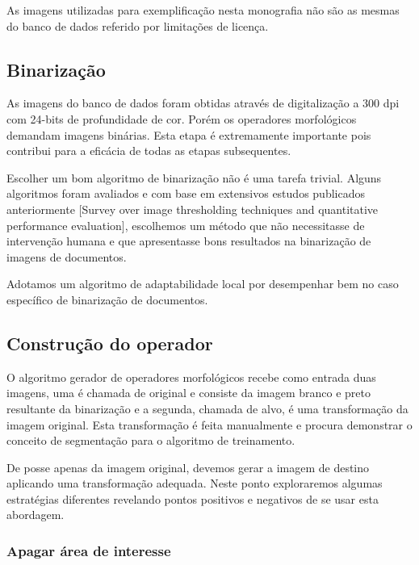 \documentclass[a4paper,11pt]{article}
\begin{document}
      As imagens utilizadas para exemplificação nesta monografia não são as mesmas do banco de dados referido por limitações de licença.

    \subsection{Binarização}

      As imagens do banco de dados foram obtidas através de digitalização a 300 dpi com 24-bits de profundidade de cor. Porém os operadores morfológicos demandam imagens binárias. Esta etapa é extremamente importante pois contribui para a eficácia de todas as etapas subsequentes.

      Escolher um bom algoritmo de binarização não é uma tarefa trivial. Alguns algoritmos foram avaliados e com base em extensivos estudos publicados anteriormente [Survey over image thresholding techniques and quantitative performance evaluation], escolhemos um método que não necessitasse de intervenção humana e que apresentasse bons resultados na binarização de imagens de documentos.

      Adotamos um algoritmo de adaptabilidade local por desempenhar bem no caso específico de binarização de documentos.

    \subsection{Construção do operador}

      O algoritmo gerador de operadores morfológicos recebe como entrada duas imagens, uma é chamada de original e consiste da imagem branco e preto resultante da binarização e a segunda, chamada de alvo, é uma transformação da imagem original. Esta transformação é feita manualmente e procura demonstrar o conceito de segmentação para o algoritmo de treinamento.


      De posse apenas da imagem original, devemos gerar a imagem de destino aplicando uma transformação adequada. Neste ponto exploraremos algumas estratégias diferentes revelando pontos positivos e negativos de se usar esta abordagem.

      \subsubsection{Apagar área de interesse}
\end{document}

